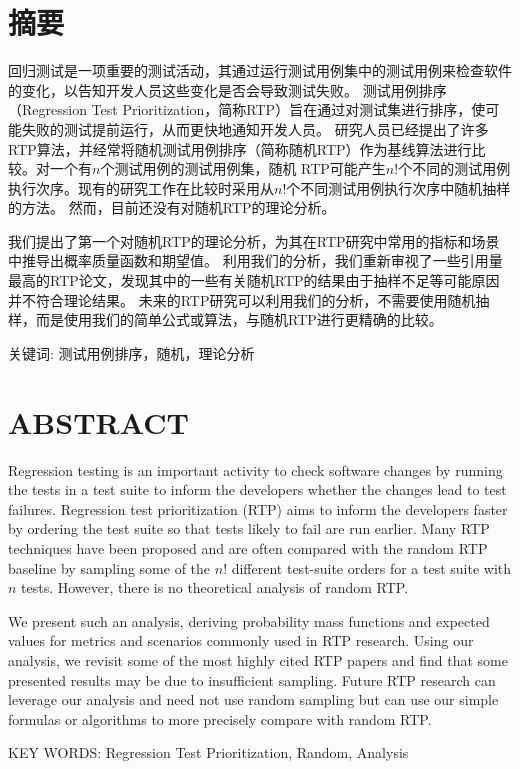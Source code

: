\chapter*{\bfseries 摘要}

回归测试是一项重要的测试活动，其通过运行测试用例集中的测试用例来检查软件的变化，以告知开发人员这些变化是否会导致测试失败。
测试用例排序（Regression Test Prioritization，简称RTP）旨在通过对测试集进行排序，使可能失败的测试提前运行，从而更快地通知开发人员。
研究人员已经提出了许多RTP算法，并经常将随机测试用例排序（简称随机RTP）作为基线算法进行比较。对一个有$n$个测试用例的测试用例集，随机 RTP可能产生$n!$个不同的测试用例执行次序。现有的研究工作在比较时采用从$n!$个不同测试用例执行次序中随机抽样的方法。
然而，目前还没有对随机RTP的理论分析。

我们提出了第一个对随机RTP的理论分析，为其在RTP研究中常用的指标和场景中推导出概率质量函数和期望值。
利用我们的分析，我们重新审视了一些引用量最高的RTP论文，发现其中的一些有关随机RTP的结果由于抽样不足等可能原因并不符合理论结果。
未来的RTP研究可以利用我们的分析，不需要使用随机抽样，而是使用我们的简单公式或算法，与随机RTP进行更精确的比较。

\bigskip
\bigskip

关键词: 测试用例排序，随机，理论分析

\chapter*{\bfseries ABSTRACT}


Regression testing is an important activity to check software changes by running the tests in a test suite to inform the developers whether the changes lead to test failures.
Regression test prioritization (RTP) aims to inform the developers faster by ordering the test suite so that tests likely to fail are run earlier.
Many RTP techniques have been proposed and are often compared with the random RTP baseline by sampling some of the $n!$ different test-suite orders for a test suite with $n$ tests.
However, there is no theoretical analysis of random RTP. 

We present such an analysis, deriving probability mass functions and expected values for metrics and scenarios commonly used in RTP research.
Using our analysis, we revisit some of the most highly cited RTP papers and find that some presented results may be due to insufficient sampling.
Future RTP research can leverage our analysis and need not use random sampling but can use our simple formulas or algorithms to more precisely compare with random RTP.

\bigskip
\bigskip

KEY WORDS: Regression Test Prioritization, Random, Analysis
